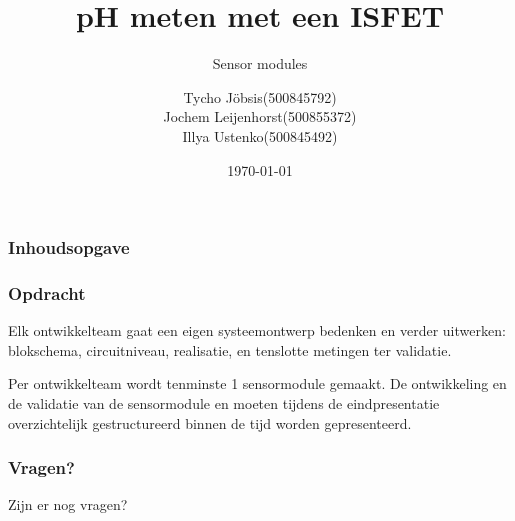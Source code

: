 \documentclass[compress]{beamer}
\institute{HvA}
\date{\today}
\begin{document}
\title{pH meten met een ISFET}
\subtitle{Sensor modules}
\author[Tycho Jöbsis \and Jochem Leijenhorst \and Illya Ustenko]{
    {
        \begin{tabular}{ll}
            Tycho Jöbsis        & (500845792)\tabularnewline
            Jochem Leijenhorst  & (500855372)\tabularnewline
            Illya Ustenko       & (500845492)        
        \end{tabular}
    }
}

    \begin{frame}
        \titlepage
    \end{frame}
    
    \begin{frame}
        \frametitle{Inhoudsopgave}\tableofcontents
    \end{frame} 

    \begin{frame}
        \frametitle{Opdracht}

        Elk ontwikkelteam gaat een eigen systeemontwerp bedenken en verder uitwerken: blokschema, circuitniveau, realisatie, en tenslotte metingen ter validatie.
    

        Per ontwikkelteam wordt tenminste 1 sensormodule gemaakt. De ontwikkeling en de validatie van de sensormodule en moeten tijdens de eindpresentatie overzichtelijk gestructureerd binnen de tijd worden gepresenteerd.

    
    \end{frame}

    

    

    

    

    \begin{frame}
        \frametitle{Vragen?}
        
        \centering
        Zijn er nog vragen?
    
    \end{frame}
\end{document}
